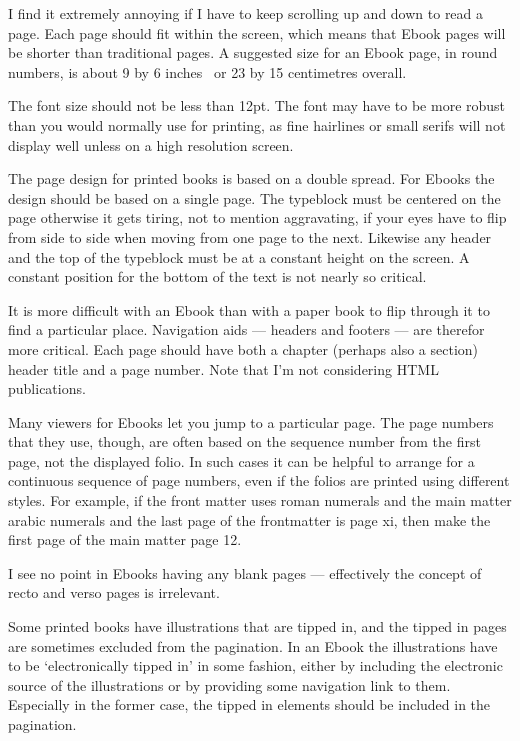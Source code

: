 \documentclass[10pt,letterpaper]{memoir}
\begin{document}
    I find it extremely annoying if I have to keep scrolling up and down
to read a page. Each page should fit within the screen, which means that
Ebook pages will be shorter than traditional pages. 
    A suggested size for an Ebook page, in round numbers, is 
about 9 by 6 inches~\cite{ADOBEBOOK} or 23 by 15 centimetres overall.

    The font size should not be less than 12pt. The font may have to be
more robust than you would normally use for printing, as fine hairlines 
or small serifs will not display well unless on a high resolution screen.

    The page design for printed books is based on a double spread. For
Ebooks the design should be based on a single page. The typeblock must
be centered on the page otherwise it gets tiring, not to mention
aggravating, if your eyes have to 
flip from side to side when moving from one page to the next. Likewise
any header and the top of the typeblock must be at a constant height
on the screen. A constant position for the bottom of the text is not
nearly so critical.

    It is more difficult with an Ebook than with a paper book to flip through
it to find a particular place. Navigation aids --- headers and footers ---
are therefor more critical. Each page should have both a chapter 
(perhaps also a section) header title and a page number. Note that I'm not
considering HTML publications.

    Many viewers for Ebooks let you jump to a particular page. The page
numbers that they use, though, are often based on the sequence number from
the first page, not the displayed folio. In such cases it can be helpful
to arrange for a continuous sequence of page numbers, even if the folios
are printed using different styles. For example, if the front matter uses
roman numerals and the main matter arabic numerals and the last page of the
frontmatter is page xi, then make the first page of the main matter page 12.

    I see no point in Ebooks having any blank pages --- effectively the
concept of recto and verso pages is irrelevant.

    Some printed books have illustrations that are tipped in, and the tipped
in pages are sometimes excluded from the pagination. In an Ebook the
illustrations have to be `electronically tipped in' in some fashion, either
by including the electronic source of the illustrations or by providing
some navigation link to them. Especially in the former case, the
tipped in elements should be included in the pagination.
\end{document}
